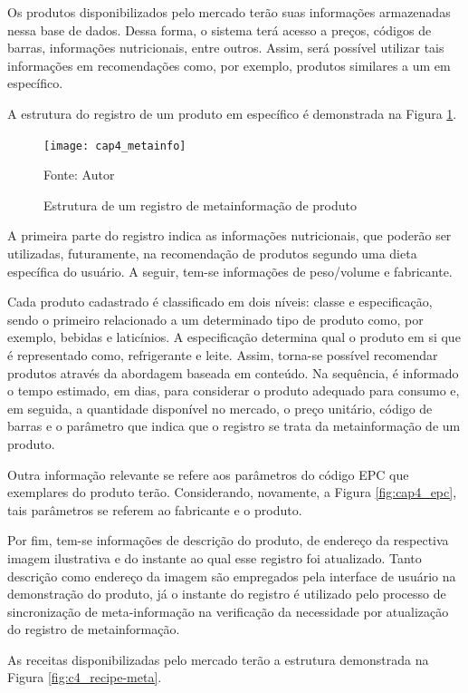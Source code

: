 
Os produtos disponibilizados pelo mercado terão suas informações armazenadas nessa base de dados. Dessa forma, o sistema terá acesso a preços, códigos de barras, informações nutricionais, entre outros. Assim, será possível utilizar tais informações em recomendações como, por exemplo, produtos similares a um em específico. 

A estrutura do registro de um produto em específico é demonstrada na Figura \ref{fig:cap4_metainfo}.

\begin{figure}[htb]
    \caption{Estrutura de um registro de metainformação de produto}
    \label{fig:cap4_metainfo}
    \texttt{[image: cap4\_metainfo]}
    
    Fonte: Autor
\end{figure}

A primeira parte do registro indica as informações nutricionais, que poderão ser utilizadas, futuramente, na recomendação de produtos segundo uma dieta específica do usuário. A seguir, tem-se informações de peso/volume e fabricante.

Cada produto cadastrado é classificado em dois níveis: classe e especificação, sendo o primeiro relacionado a um determinado tipo de produto como, por exemplo, bebidas e laticínios. A especificação determina qual o produto em si que é representado como, refrigerante e leite. Assim, torna-se possível recomendar produtos através da abordagem baseada em conteúdo.
Na sequência, é informado o tempo estimado, em dias, para considerar o produto adequado para consumo e, em seguida, a quantidade disponível no mercado, o preço unitário, código de barras e o parâmetro que indica que o registro se trata da metainformação de um produto.

Outra informação relevante se refere aos parâmetros do código EPC que exemplares do produto terão. Considerando, novamente, a Figura \ref{fig:cap4_epc}, tais parâmetros se referem ao fabricante e o produto.

Por fim, tem-se informações de descrição do produto, de endereço da respectiva imagem ilustrativa e do instante ao qual esse registro foi atualizado. Tanto descrição como endereço da imagem são empregados pela interface de usuário na demonstração do produto, já o instante do registro é utilizado pelo processo de sincronização de meta-informação na verificação da necessidade por atualização do registro de metainformação.

As receitas disponibilizadas pelo mercado terão a estrutura demonstrada na Figura \ref{fig:c4_recipe-meta}.


